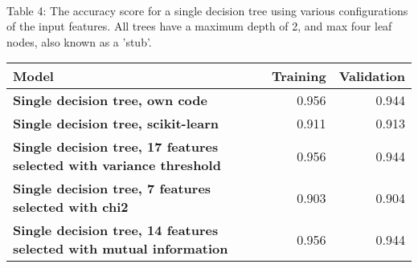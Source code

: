 \documentclass[11pt]{article}
\begin{document}
{ \hspace*{\fill} \\}
Table 4: The accuracy score for a single decision tree using various configurations of the input features. All trees have a maximum depth of 2, and max four leaf nodes, also known as a 'stub'.
\begin{table}[h!]
	\begin{center}
		\label{tab:table1}
		\begin{tabular}{l|r|r}
			\textbf{Model}                                                      		   & \textbf{Training} & \textbf{Validation}
			\\ \hline
			\textbf{Single decision tree, own code}                                        & 0.956         & 0.944               \\ \hline
			\textbf{Single decision tree, scikit-learn}                                    & 0.911         & 0.913               \\ \hline
			\textbf{Single decision tree, 17 features selected with variance threshold}    & 0.956         & 0.944               \\ \hline
			\textbf{Single decision tree, 7 features selected with chi2}                   & 0.903         & 0.904               \\ \hline
			\textbf{Single decision tree, 14 features selected with mutual information}    & 0.956         & 0.944               \\ \hline
		\end{tabular}
	\end{center}
\end{table}
\end{document}
